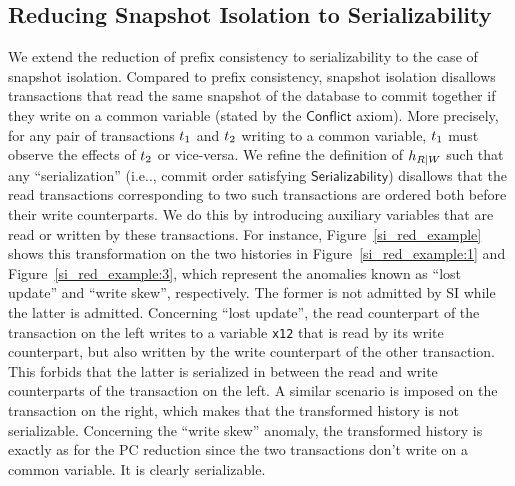


\subsection{Reducing Snapshot Isolation to Serializability}\label{ssec:si}

We extend the reduction of prefix consistency to serializability to the case of snapshot isolation. Compared to prefix consistency, snapshot isolation disallows transactions that read the same snapshot of the database to commit together if they write on a common variable (stated by the $\mathsf{Conflict}$ axiom). More precisely, for any pair of transactions ${t}_1$ and ${t}_2$ writing to a common variable, ${t}_1$ must observe the effects of ${t}_2$ or vice-versa. 
We refine the definition of ${h}_{R|W}$ such that any ``serialization'' (i.e.., commit order satisfying $\mathsf{Serializability}$) disallows that the read transactions corresponding to two such transactions are ordered both before their write counterparts. We do this by introducing auxiliary variables that are read or written by these transactions. For instance, 
Figure~\ref{si_red_example} shows this transformation on the two histories in Figure~\ref{si_red_example:1} and Figure~\ref{si_red_example:3}, which represent the anomalies known as ``lost update'' and ``write skew'', respectively. The former is not admitted by SI while the latter is admitted. Concerning ``lost update'', the read counterpart of the transaction on the left writes to a variable {\tt x12} that is read by its write counterpart, but also written by the write counterpart of the other transaction. This forbids that the latter is serialized in between the read and write counterparts of the transaction on the left. A similar scenario is imposed on the transaction on the right, which makes that the transformed history is not serializable. Concerning the ``write skew'' anomaly, the transformed history is exactly as for the PC reduction since the two transactions don't write on a common variable. It is clearly serializable.


